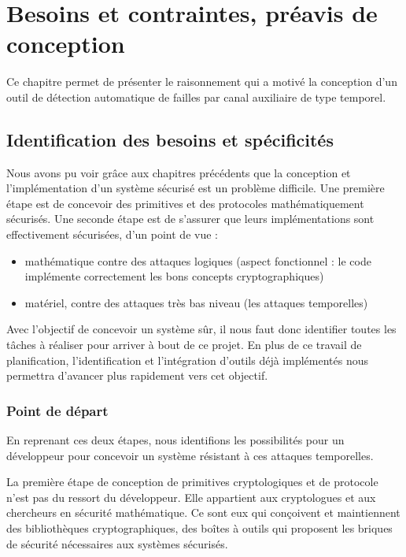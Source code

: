 \chapter{Besoins et contraintes, préavis de conception}
\label{chap:erysichtonConception}


Ce chapitre permet de présenter le raisonnement qui a motivé la conception d'un outil de détection automatique de failles par canal auxiliaire de type temporel.

\section{Identification des besoins et spécificités}

Nous avons pu voir grâce aux chapitres précédents que la conception et l'implémentation d'un système sécurisé est un problème difficile. Une première étape est de concevoir des primitives et des protocoles mathématiquement sécurisés. Une seconde étape est de s’assurer que leurs implémentations sont effectivement sécurisées, d'un point de vue : 

\begin{itemize}
    \item mathématique contre des attaques logiques (aspect fonctionnel : le code implémente correctement les bons concepts cryptographiques)
    \item matériel, contre des attaques très bas niveau (les attaques temporelles)
\end{itemize}

Avec l'objectif de concevoir un système sûr, il nous faut donc identifier toutes les tâches à réaliser pour arriver à bout de ce projet. En plus de ce travail de planification, l'identification et l'intégration d'outils déjà implémentés nous permettra d'avancer plus rapidement vers cet objectif.\smallbreak


\subsection*{Point de départ}

En reprenant ces deux étapes, nous identifions les possibilités pour un développeur pour concevoir un système résistant à ces attaques temporelles.\smallbreak

La première étape de conception de primitives cryptologiques et de protocole n'est pas du ressort du développeur. Elle appartient aux cryptologues et aux chercheurs en sécurité mathématique. Ce sont eux qui conçoivent et maintiennent des bibliothèques cryptographiques, des boîtes à outils qui proposent les briques de sécurité nécessaires aux systèmes sécurisés.\medbreak

